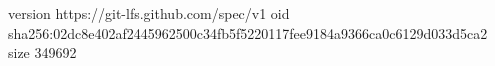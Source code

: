 version https://git-lfs.github.com/spec/v1
oid sha256:02dc8e402af2445962500c34fb5f5220117fee9184a9366ca0c6129d033d5ca2
size 349692
